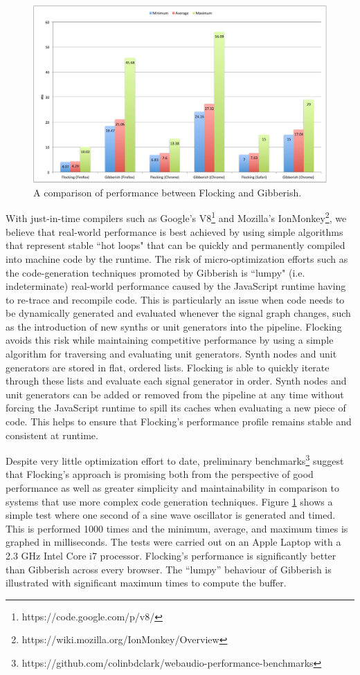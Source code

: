 \documentclass{article}
\begin{document}
\begin{figure}[ht]
\centering
\includegraphics[width=0.9\columnwidth]{images/FlockingVsGibberish.pdf}
\caption{ A comparison of performance between Flocking and Gibberish.\label{fig:flockingvsgibberish}}
\end{figure}

With just-in-time compilers such as Google's V8\footnote{https://code.google.com/p/v8/} and Mozilla's IonMonkey\footnote{https://wiki.mozilla.org/IonMonkey/Overview}, we believe that real-world performance is best achieved by using simple algorithms that represent stable ``hot loops" that can be quickly and permanently  compiled into machine code by the runtime. The risk of micro-optimization efforts such as the code-generation techniques promoted by Gibberish is ``lumpy" (i.e. indeterminate) real-world performance caused by the JavaScript runtime having to re-trace and recompile code. This is particularly an issue when code needs to be dynamically generated and evaluated whenever the signal graph changes, such as the introduction of new synths or unit generators into the pipeline. Flocking avoids this risk while maintaining competitive performance by using a simple algorithm for traversing and evaluating unit generators. Synth nodes and unit generators are stored in flat, ordered lists. Flocking is able to quickly iterate through these lists and evaluate each signal generator in order. Synth nodes and unit generators can be added or removed from the pipeline at any time without forcing the JavaScript runtime to spill its caches when evaluating a new piece of code. This helps to ensure that Flocking's performance profile remains stable and consistent at runtime. 

Despite very little optimization effort to date, preliminary benchmarks\footnote{https://github.com/colinbdclark/webaudio-performance-benchmarks} suggest that Flocking's approach is promising both from the perspective of good performance as well as greater simplicity and maintainability in comparison to systems that use more complex code generation techniques. Figure \ref{fig:flockingvsgibberish} shows a simple test where one second of a sine wave oscillator is generated and timed. This is performed 1000 times and the minimum, average, and maximum times is graphed in milliseconds. The tests were carried out on an Apple Laptop with a 2.3 GHz Intel Core i7 processor.  Flocking's performance is significantly better than Gibberish across every browser. The ``lumpy'' behaviour of Gibberish is illustrated with significant maximum times to compute the buffer.
\end{document}
